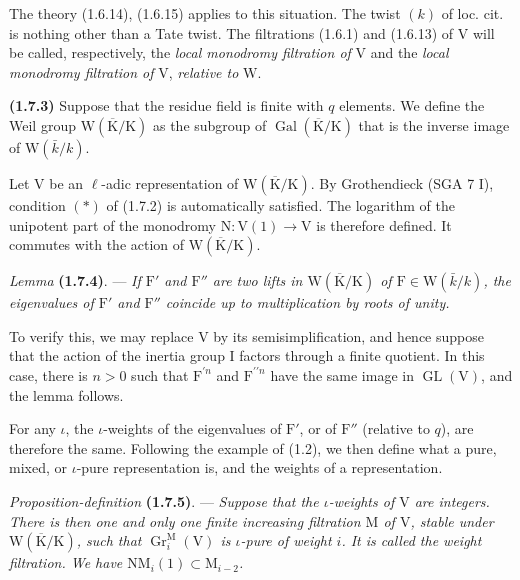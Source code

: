 \documentclass[11pt,leqno]{article}
\begin{document}
The theory (1.6.14), (1.6.15) applies to this situation. The twist \((k)\) of loc. cit. is nothing other than a Tate twist. The filtrations (1.6.1) and (1.6.13) of \(\mathrm{V}\) will be called, respectively, the \textit{local monodromy filtration of} \(\mathrm{V}\) and the \textit{local monodromy filtration of} \(\mathrm{V}\), \textit{relative to} \(\mathrm{W}\).

\textbf{(1.7.3)} Suppose that the residue field is finite with \(q\) elements. We define the Weil group \(\mathrm{W}(\overline{\mathrm{K}}/\mathrm{K})\) as the subgroup of \(\operatorname{Gal}(\overline{\mathrm{K}}/\mathrm{K})\) that is the inverse image of \(\mathrm{W}(\bar{k}/k)\).

Let \(\mathrm{V}\) be an \(\ell\)-adic representation of \(\mathrm{W}(\overline{\mathrm{K}}/\mathrm{K})\). By Grothendieck (SGA 7 I), condition \((*)\) of (1.7.2) is automatically satisfied. The logarithm of the unipotent part of the monodromy \(\mathrm{N}:\mathrm{V}(1)\to\mathrm{V}\) is therefore defined. It commutes with the action of \(\mathrm{W}(\overline{\mathrm{K}}/\mathrm{K})\).

\textit{Lemma} \textbf{(1.7.4)}. — \textit{If \(\mathrm{F}'\) and \(\mathrm{F}''\) are two lifts in \(\mathrm{W}(\overline{\mathrm{K}}/\mathrm{K})\) of \(\mathrm{F}\in\mathrm{W}(\bar{k}/k)\), the eigenvalues of \(\mathrm{F}'\) and \(\mathrm{F}''\) coincide up to multiplication by roots of unity.}

To verify this, we may replace \(\mathrm{V}\) by its semisimplification, and hence suppose that the action of the inertia group \(\mathrm{I}\) factors through a finite quotient. In this case, there is \(n>0\) such that \(\mathrm{F}^{\prime n}\) and \(\mathrm{F}^{\prime\prime n}\) have the same image in \(\operatorname{GL}(\mathrm{V})\), and the lemma follows.

For any \(\iota\), the \(\iota\)-weights of the eigenvalues of \(\mathrm{F}'\), or of \(\mathrm{F}''\) (relative to \(q\)), are therefore the same. Following the example of (1.2), we then define what a pure, mixed, or \(\iota\)-pure representation is, and the weights of a representation.

\textit{Proposition-definition} \textbf{(1.7.5)}. — \textit{Suppose that the \(\iota\)-weights of \(\mathrm{V}\) are integers. There is then one and only one finite increasing filtration \(\mathrm{M}\) of \(\mathrm{V}\), stable under \(\mathrm{W}(\overline{\mathrm{K}}/\mathrm{K})\), such that \(\operatorname{Gr}_i^{\mathrm{M}}(\mathrm{V})\) is \(\iota\)-pure of weight \(i\). It is called the \textup{weight filtration}. We have \(\mathrm{N}\mathrm{M}_i(1)\subset\mathrm{M}_{i-2}\).}
\end{document}
